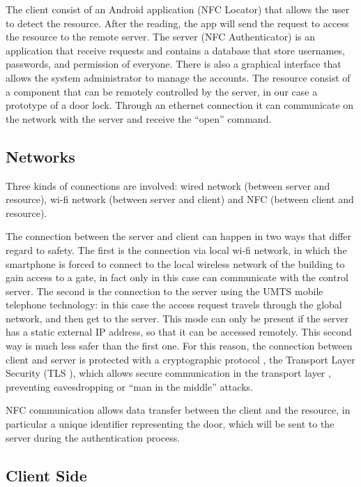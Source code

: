 \documentclass[conference]{IEEEtran}
\begin{document}
The client consist of an Android application (NFC Locator) that allows the user to detect the resource. After the reading, the app will send the request to access the resource to the remote server.
The server (NFC Authenticator) is an application that receive requests and contains a database that store usernames, passwords, and permission of everyone.  There is also a graphical interface that allows the system administrator to manage the accounts.
The resource consist of a component that can be remotely controlled by the server, in our case a prototype of a door lock. Through an ethernet connection it can communicate on the network with the server and receive the “open” command.

\subsection{Networks}

Three kinds of connections are involved: wired network (between server and resource), wi-fi network (between server and client) and NFC (between client and resource).

The connection between the server and client can happen in two ways that differ regard to safety. The first is the connection via local wi-fi network, in which the smartphone is forced to connect to the local wireless network of the building to gain access to a gate, in fact only in this case can communicate with the control server. The second is the connection to the server using the UMTS mobile telephone technology: in this case the access request travels through the global network, and then get to the server. This mode can only be present if the server has a static external IP address, so that it can be accessed remotely. This second way is much less safer than the first one. For this reason, the connection between client and server is protected with a cryptographic protocol , the Transport Layer Security (TLS ), which allows secure communication in the transport layer , preventing eavesdropping or “man in the middle” attacks. 

NFC communication allows data transfer between the client and the resource, in particular a unique identifier representing the door, which will be sent to the server during the authentication process.

\subsection{Client Side}
\end{document}
